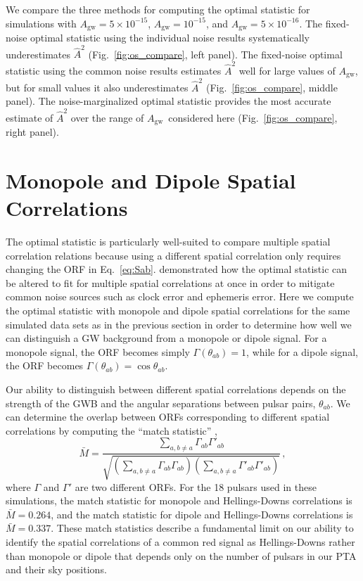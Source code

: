 \documentclass[twocolumn,aps,prd,superscriptaddress]{revtex4-1}
\newcommand{\Agw}{\ensuremath{A_\mathrm{gw}}}
\begin{document}
We compare the three methods for computing the optimal statistic for 
simulations with $\Agw=5\times10^{-15}$, $\Agw=10^{-15}$, and $\Agw=5\times10^{-16}$. 
The fixed-noise optimal statistic using the individual noise results systematically underestimates $\hat{A}^2$ 
(Fig.~\ref{fig:os_compare}, left panel). 
The fixed-noise optimal statistic using the common noise results 
estimates $\hat{A}^2$ well for large values of $\Agw$, but for small values it also underestimates $\hat{A}^2$ 
(Fig.~\ref{fig:os_compare}, middle panel). 
The noise-marginalized optimal statistic provides the most accurate estimate of $\hat{A}^2$ 
over the range of \Agw\ considered here (Fig.~\ref{fig:os_compare}, right panel).


\section{Monopole and Dipole Spatial Correlations}
\label{sec:spatial}

The optimal statistic is particularly well-suited to compare multiple spatial correlation relations 
because using a different spatial correlation only requires changing the ORF 
in Eq.~\eqref{eq:Sab}. 
\citet{thk+2016} demonstrated how the optimal statistic can be altered to fit for 
multiple spatial correlations at once in order to mitigate common noise sources such as 
clock error and ephemeris error. 
Here we compute the optimal statistic with monopole and dipole spatial correlations 
for the same simulated data sets as in the previous section in order to determine 
how well we can distinguish a GW background from a monopole or dipole signal. 
For a monopole signal, the ORF becomes simply
$\Gamma(\theta_{ab}) = 1$, 
while for a dipole signal, the ORF becomes
$\Gamma(\theta_{ab}) = \cos\theta_{ab}$.

Our ability to distinguish between different spatial correlations 
depends on the strength of the GWB 
and the angular separations between pulsar pairs, $\theta_{ab}$. 
We can determine the overlap between ORFs corresponding to different spatial correlations 
by computing the ``match statistic'' \citep{cs2016},
\begin{equation}
	\bar{M} = \frac{\sum_{a,b \neq a} \Gamma_{ab} \Gamma'_{ab}}{\sqrt{ \left( \sum_{a, b \neq a} \Gamma_{ab} \Gamma_{ab} \right) \left( \sum_{a, b \neq a} \Gamma'_{ab} \Gamma'_{ab} \right)}} \,,
\end{equation}
where $\Gamma$ and $\Gamma'$ are two different ORFs. 
For the 18 pulsars used in these simulations, the 
match statistic for monopole and Hellings-Downs correlations is $\bar{M} = 0.264$, 
and the match statistic for dipole and Hellings-Downs correlations is $\bar{M} = 0.337$. 
These match statistics describe a fundamental limit on our ability 
to identify the spatial correlations of a common red signal as Hellings-Downs 
rather than monopole or dipole 
that depends only on the number of pulsars in our PTA and their sky positions.
\end{document}
